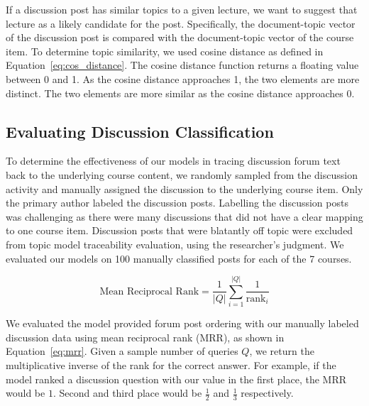 \documentclass[sigconf, anonymous]{acmart}
\begin{document}
If a discussion post has similar topics to a given lecture, we want to suggest that lecture as a likely candidate for the post.
Specifically, the document-topic vector of the discussion post is compared with the document-topic vector of the course item.
To determine topic similarity, we used cosine distance as defined in Equation~\ref{eq:cos_distance}.
The cosine distance function returns a floating value between 0 and 1. As the cosine distance approaches 1, the two elements are more distinct. The two elements are more similar as the cosine distance approaches 0.


\subsection{Evaluating Discussion Classification}


To determine the effectiveness of our models in tracing discussion forum text back to the underlying course content, we randomly sampled from the discussion activity and manually assigned the discussion to the underlying course item.
Only the primary author labeled the discussion posts.
Labelling the discussion posts was challenging as there were many discussions that did not have a clear mapping to one course item.
Discussion posts that were blatantly off topic were excluded from topic model traceability evaluation, using the researcher's judgment.
We evaluated our models on 100 manually classified posts for each of the 7 courses.

\begin{equation}
    \text{Mean Reciprocal Rank} = \frac{1}{|Q|} \sum^{|Q|}_{i=1}\frac{1}{\text{rank}_i}
    \label{eq:mrr}
\end{equation}

We evaluated the model provided forum post ordering with our manually labeled discussion data using mean reciprocal rank (MRR), as shown in Equation~\ref{eq:mrr}.
Given a sample number of queries $Q$, we return the multiplicative inverse of the rank for the correct answer.
For example, if the model ranked a discussion question with our value in the first place, the MRR would be $1$.
Second and third place would be $\frac{1}{2}$ and $\frac{1}{3}$ respectively.
\end{document}
